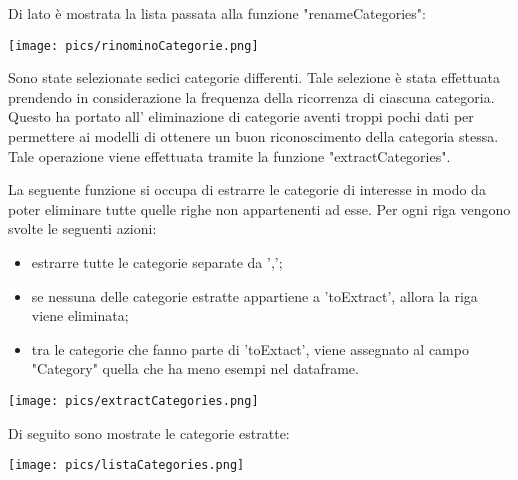 \documentclass[12pt,oneside]{article}
\begin{document}
\begin{enumerate}
    \begin{minipage}[t]{0.39\textwidth}
    \vspace{30pt}
    Di lato è mostrata la lista passata alla funzione "renameCategories":
    \end{minipage}
    \hfill
    \begin{minipage}[t]{0.50\textwidth}
    \vspace{20pt}
    \texttt{[image: pics/rinominoCategorie.png]}
    \end{minipage}
    
    \begin{justify}
    Sono state selezionate sedici categorie differenti. Tale selezione è stata effettuata prendendo in considerazione la frequenza della ricorrenza di ciascuna categoria. Questo ha portato all' eliminazione di categorie aventi troppi pochi dati per permettere ai modelli di ottenere un buon riconoscimento della categoria stessa. Tale operazione viene effettuata tramite la funzione "extractCategories".
    \end{justify}

    \begin{justify}
    La seguente funzione si occupa di estrarre le categorie di interesse in modo da poter eliminare tutte quelle righe non appartenenti ad esse. 
    Per ogni riga vengono svolte le seguenti azioni:
    \begin{itemize}
        \item estrarre tutte le categorie separate da ',';
        \item se nessuna delle categorie estratte appartiene a 'toExtract', allora la riga viene eliminata;
        \item tra le categorie che fanno parte di 'toExtact', viene assegnato al campo "Category" quella che ha meno esempi nel dataframe.
    \end{itemize}
    \end{justify}

    \texttt{[image: pics/extractCategories.png]}

    \begin{justify}
    Di seguito sono mostrate le categorie estratte: 
    \end{justify}
    \texttt{[image: pics/listaCategories.png]}


\end{enumerate}
\end{document}
